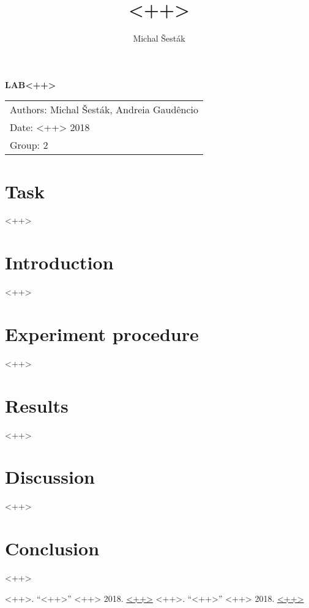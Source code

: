 \documentclass[11pt,a4paper]{article}
\author{Michal Šesták}
\title{<++>}
\begin{document}
\renewcommand{\figurename}{Fig.}
\renewcommand{\tablename}{Tab.}

\LARGE
\begin{center}
\textbf{LAB<++>}
\end{center}\normalsize

\begin{center}
\begin{tabular}{l }
Authors: Michal Šesták, Andreia Gaudêncio \\
Date: <++> 2018\\
Group: 2 \\
\end{tabular}
\end{center}

\section{Task}
<++>
\section{Introduction}
<++>
\section{Experiment procedure}
<++>
\section{Results}
<++>
\section{Discussion}
<++>
\section{Conclusion}
<++>
\begin{thebibliography}{Mm99}
\bibitem{<++>} <++>. “<++>” <++> 2018. \url{<++>}
\bibitem{<++>} <++>. “<++>” <++> 2018. \url{<++>}
\end{thebibliography}
\end{document}
